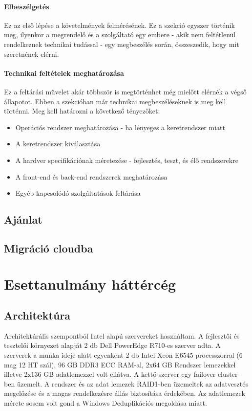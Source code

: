 \documentclass[12pt,oneside,justify,table]{book}
\begin{document}
\subsubsection{Elbeszélgetés}
Ez az első lépése a követelmények felmérésének. Ez a szekció egyszer történik meg, ilyenkor a megrendelő és a szolgáltató egy embere - akik nem feltétlenül rendelkeznek technikai tudással - egy megbeszélés során, összeszedik, hogy mit szeretnének elérni. 

\subsubsection{Technikai feltételek meghatározása}
Ez a feltárási művelet akár többször is megtörténhet még mielőtt elérnék a végső állapotot. Ebben a szekcióban már technikai megbeszéléseknek is meg kell történni. 
Meg kell határozni a következő tényezőket:
\begin{itemize}
	\item Operációs rendszer meghatározása - ha lényeges a keretrendszer miatt
	\item A keretrendszer kiválasztása
	\item A hardver specifikációnak méretezése - fejlesztés, teszt, és élő rendszerekre
	\item A front-end és back-end rendszerek meghatározása
	\item Egyéb kapcsolódó szolgáltatások feltárása 
\end{itemize}


\section{Ajánlat}


\section{Migráció cloudba}



\chapter{Esettanulmány háttércég}

\section{Architektúra}

Architektúrális szempontból Intel alapú szervereket használtam. A fejlesztői és tesztelői környezet alapját 2 db Dell PowerEdge R710-es szerver adta. A szerverek a munka ideje alatt egyenként 2 db Intel Xeon E6545 processzorral (6 mag 12 HT szál), 96 GB DDR3 ECC RAM-al, 2x64 GB Rendszer lemezekkel illetve 2x136 GB adatlemezzel volt ellátva. A kettő szerver egy failover cluster-ben üzemelt. A rendszer és az adat lemezek RAID1-ben üzemeltek az adatvesztés megelőzése és a magas rendelkezésre állás biztosítása érdekében. Az adatlemezek mérete sosem volt gond a Windows Deduplikációs megoldása miatt.
\end{document}

